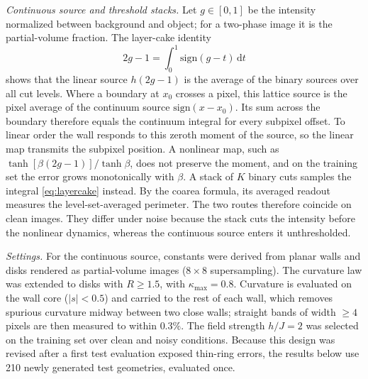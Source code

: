 \documentclass[11pt,a4paper]{article}
\newcommand{\dd}{\mathrm{d}}
\begin{document}
\emph{Continuous source and threshold stacks.} Let $g\in[0,1]$ be the intensity normalized between background and object; for a two-phase image it is the partial-volume fraction. The layer-cake identity
\begin{equation}
2g-1=\int_0^1\mathrm{sign}(g-t)\,\dd t
\label{eq:layercake}
\end{equation}
shows that the linear source $h(2g-1)$ is the average of the binary sources over all cut levels. Where a boundary at $x_0$ crosses a pixel, this lattice source is the pixel average of the continuum source $\mathrm{sign}(x-x_0)$. Its sum across the boundary therefore equals the continuum integral for every subpixel offset. To linear order the wall responds to this zeroth moment of the source, so the linear map transmits the subpixel position. A nonlinear map, such as $\tanh[\beta(2g-1)]/\tanh\beta$, does not preserve the moment, and on the training set the error grows monotonically with $\beta$. A stack of $K$ binary cuts samples the integral \eqref{eq:layercake} instead. By the coarea formula, its averaged readout measures the level-set-averaged perimeter. The two routes therefore coincide on clean images. They differ under noise because the stack cuts the intensity before the nonlinear dynamics, whereas the continuous source enters it unthresholded.

\emph{Settings.} For the continuous source, constants were derived from planar walls and disks rendered as partial-volume images ($8\times8$ supersampling). The curvature law was extended to disks with $R\ge1.5$, with $\kappa_{\max}=0.8$. Curvature is evaluated on the wall core ($|s|<0.5$) and carried to the rest of each wall, which removes spurious curvature midway between two close walls; straight bands of width $\ge4$ pixels are then measured to within $0.3\%$. The field strength $h/J=2$ was selected on the training set over clean and noisy conditions. Because this design was revised after a first test evaluation exposed thin-ring errors, the results below use 210 newly generated test geometries, evaluated once.
\end{document}
